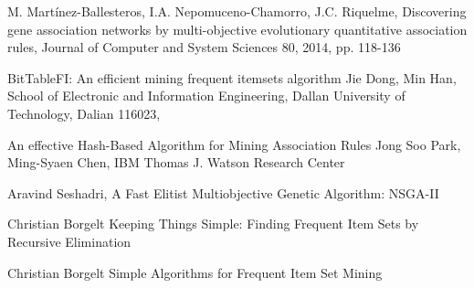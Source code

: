 \documentclass[12pt,spanish]{article}
\begin{document}
\begin{thebibliography}{9}

	M. Martínez-Ballesteros, I.A. Nepomuceno-Chamorro, J.C. Riquelme,
	Discovering gene association networks by multi-objective evolutionary quantitative association rules,
	Journal of Computer and System Sciences 80, 2014,
	pp. 118-136

	BitTableFI: An efficient mining frequent itemsets algorithm
	Jie Dong, Min Han,
	School of Electronic and Information Engineering, Dallan University of Technology, Dalian 116023,

	An effective Hash-Based Algorithm for Mining Association Rules
	Jong Soo Park, Ming-Syaen Chen,
	IBM Thomas J. Watson Research Center

	Aravind Seshadri,
	A Fast Elitist Multiobjective Genetic Algorithm: NSGA-II

	Christian Borgelt
	Keeping Things Simple: Finding Frequent Item Sets by Recursive Elimination

	Christian Borgelt
	Simple Algorithms for Frequent Item Set Mining

\end{thebibliography}
\end{document}
